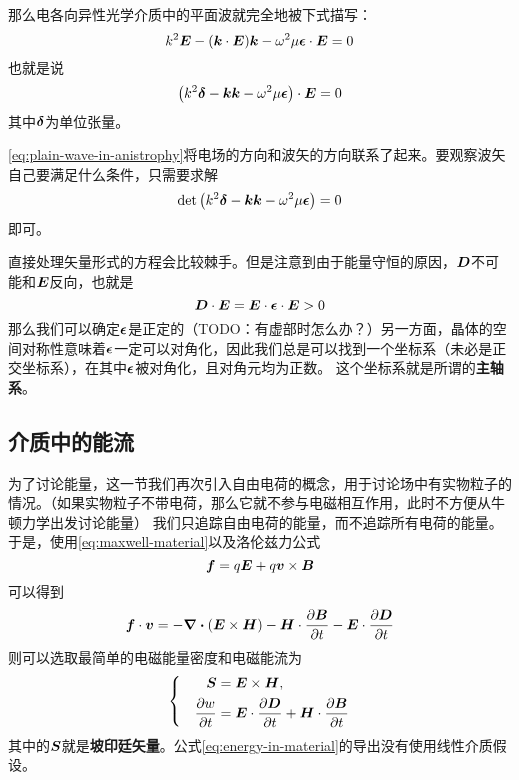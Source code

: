 \documentclass[UTF8, a4paper]{ctexart}
\newenvironment{bigcase}{\left\{\quad\begin{aligned}}{\end{aligned}\right.}
\begin{document}
那么电各向异性光学介质中的平面波就完全地被下式描写：
\[
    k^2 \vb*{E} - (\vb*{k} \cdot \vb*{E}) \vb*{k} - \omega^2 \mu \vb*{\epsilon} \cdot \vb*{E} = 0
\]
也就是说
\begin{equation}
    \left( k^2 \vb*{\delta} - \vb*{k} \vb*{k} - \omega^2 \mu \vb*{\epsilon} \right) \cdot \vb*{E} = 0
    \label{eq:plain-wave-in-anistrophy}
\end{equation}
其中$\vb*{\delta}$为单位张量。

\eqref{eq:plain-wave-in-anistrophy}将电场的方向和波矢的方向联系了起来。要观察波矢自己要满足什么条件，只需要求解
\begin{equation}
    \det \left( k^2 \vb*{\delta} - \vb*{k} \vb*{k} - \omega^2 \mu \vb*{\epsilon} \right) = 0
    \label{eq:k-det}
\end{equation}
即可。

直接处理矢量形式的方程会比较棘手。但是注意到由于能量守恒的原因，$\vb*{D}$不可能和$\vb*{E}$反向，也就是
\[
    \vb*{D} \cdot \vb*{E} = \vb*{E} \cdot \vb*{\epsilon} \cdot \vb*{E} > 0
\]
那么我们可以确定$\vb*{\epsilon}$是正定的（TODO：有虚部时怎么办？）另一方面，晶体的空间对称性意味着$\vb*{\epsilon}$一定可以对角化，因此我们总是可以找到一个坐标系（未必是正交坐标系），在其中$\vb*{\epsilon}$被对角化，且对角元均为正数。
这个坐标系就是所谓的\textbf{主轴系}。

\subsection{介质中的能流}

为了讨论能量，这一节我们再次引入自由电荷的概念，用于讨论场中有实物粒子的情况。（如果实物粒子不带电荷，那么它就不参与电磁相互作用，此时不方便从牛顿力学出发讨论能量）
我们只追踪自由电荷的能量，而不追踪所有电荷的能量。
于是，使用\eqref{eq:maxwell-material}以及洛伦兹力公式
\[
    \vb*{f} = q \vb*{E} + q \vb*{v} \times \vb*{B}
\]
可以得到
\[
    \vb*{f} \cdot \vb*{v} = - \div{(\vb*{E} \times \vb*{H})} - \vb*{H} \cdot \pdv{\vb*{B}}{t} - \vb*{E} \cdot \pdv{\vb*{D}}{t}
\]
则可以选取最简单的电磁能量密度和电磁能流为
\begin{equation}
    \begin{bigcase}
        \vb*{S} &= \vb*{E} \times \vb*{H}, \\
        \pdv{w}{t} &= \vb*{E} \cdot \pdv{\vb*{D}}{t} + \vb*{H} \cdot \pdv{\vb*{B}}{t}
    \end{bigcase}
    \label{eq:energy-in-material}
\end{equation}
其中的$\vb*{S}$就是\textbf{坡印廷矢量}。公式\eqref{eq:energy-in-material}的导出没有使用线性介质假设。
\end{document}

